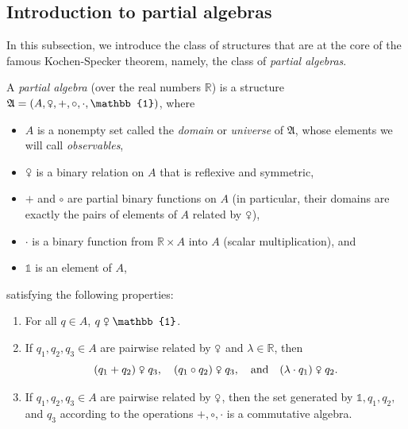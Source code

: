 \documentclass{scrartcl}
\newcommand{\FA}{\mathfrak{A}}
\newcommand{\BR}{\mathbb{R}}
\newcommand{\com}{\mathrel{\venus}}
\begin{document}
\subsection{Introduction to partial algebras}


In this subsection, we introduce the class of structures that are at the core of the famous Kochen-Specker theorem, namely, the class of \emph{partial algebras}.

\begin{definition}\label{D:partial algebra}
A \emph{partial algebra} (over the real numbers $\BR$) is a structure $\FA = (A, \com, +, \circ, \cdot, \mathbb{1})$, where
\begin{itemize}

\item $A$ is a nonempty set called the \emph{domain} or \emph{universe} of $\FA$,  whose elements we will call \emph{observables},

\item
$\venus$ is a binary relation on $A$ that is reflexive and symmetric,

\item
$+$ and $\circ$ are partial binary functions on $A$ (in particular, their domains are exactly the pairs of elements of $A$ related by $\venus$),

\item
$\cdot$ is a binary function from $\BR\times A$ into $A$ (scalar multiplication), and

\item
$\mathbb{1}$ is an element of $A$,
\end{itemize}
satisfying the following properties:

\begin{enumerate}[1)]

\item
For all $q\in A$, $q \com \mathbb{1}$.

\item
If $q_1,q_2,q_3\in A$ are pairwise related by $\venus$ and $\lambda\in\BR$, then
\[
(q_1 + q_2) \com q_3, \quad (q_1 \circ q_2) \com q_3, \quad \text{and} \quad (\lambda \cdot q_1) \com q_2.
\]

\item 
If $q_1,q_2,q_3\in A$ are pairwise related by $\venus$, then the set generated by $\mathbb{1},q_1,q_2,$ and $q_3$ according to the operations $+,\circ,\cdot$ is a commutative algebra.

\end{enumerate}

\end{definition}
\end{document}
